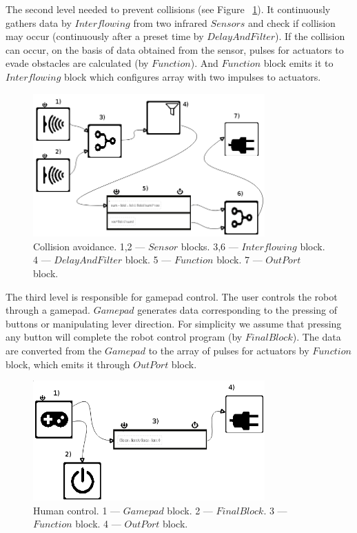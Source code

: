 \documentclass[conference,compsoc]{IEEEtran}
\begin{document}
The second level needed to prevent collisions (see Figure ~\ref{image:2l}). It continuously gathers data by $Interflowing$ from two infrared $Sensors$ and check if collision may occur (continuously after a preset time by $DelayAndFilter$). If the collision can occur, on the basis of data obtained from the sensor, pulses for actuators to evade obstacles are calculated (by $Function$). And $Function$ block emits it to $Interflowing$ block which configures array with two impulses to actuators.

\begin{figure}[ht]
	\centering
	\includegraphics[width=3.5in]{2l.png}
	\caption{Collision avoidance. 1,2 --- $Sensor$ blocks. 3,6 --- $Interflowing$ block. 4 --- $DelayAndFilter$ block. 5 --- $Function$ block. 7 --- $OutPort$ block.}
	\label{image:2l}
\end{figure}

The third level is responsible for gamepad control. The user controls the robot through a gamepad. $Gamepad$ generates data corresponding to the pressing of buttons or manipulating lever direction. For simplicity we assume that pressing any button will complete the robot control program (by $FinalBlock$). The data are converted from the $Gamepad$ to the array of pulses for actuators by $Function$ block, which emits it through $OutPort$ block.

\begin{figure}[ht]
	\centering
	\includegraphics[width=3.5in]{3l.png}
	\caption{Human control. 1 --- $Gamepad$ block. 2 --- $FinalBlock$. 3 --- $Function$ block. 4 --- $OutPort$ block.}
	\label{image:3l}
\end{figure}
\end{document}
